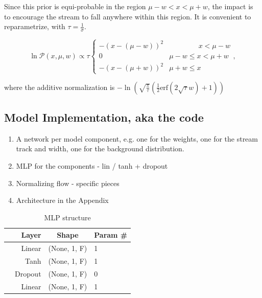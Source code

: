 \documentclass[twocolumn]{aastex631}
\newcommand{\mcal}[1]{\mathcal{#1}}
\newcommand{\pdf}{\mcal{P}}
\begin{document}
            Since this prior is equi-probable in the region $\mu - w < x < \mu + w$, the  impact is to encourage the stream to fall anywhere within this region. 
            It is convenient to reparametrize, with $\tau = \frac{1}{\sigma}$.
            \begin{small}
            \begin{equation}
                \ln \pdf(x,\mu,w) \propto \tau \begin{cases} 
                    -\left(x-(\mu-w)\right)^2 & \phantom{\mu - w <}\ x < \mu - w \\
                    0 & \mu - w \leq x < \mu + w \\
                    -\left(x-(\mu+w)\right)^2 & \mu + w \leq x
                \end{cases},
            \end{equation}\end{small}
            where the additive normalization is 
            $-\ln\left(\sqrt{\frac{\pi}{\tau}} \left(\frac{1}{2}\text{erf}\left(2 \sqrt{\tau } w\right)+1\right)\right)$


    \subsection{Model Implementation, aka the code} \label{sub:model_implementation}


        \begin{enumerate}
            \item A network per model component, e.g. one for the weights, one for the stream track and width, one for the background distribution.
            \item MLP for the components - lin / tanh + dropout
            \item Normalizing flow - specific pieces
            \item Architecture in the Appendix
        \end{enumerate}


        \begin{table}
            \centering
            \caption{MLP structure}
            \begin{tabular}{@{}rrcl@{}}
            \toprule
            & Layer & Shape & Param \# \\
            \midrule
            & Linear & (None, 1, F) & 1  \\
            & Tanh & (None, 1, F) & 1  \\
            & Dropout & (None, 1, F) & 0  \\
            & Linear & (None, 1, F) & 1  \\
            \bottomrule
            \end{tabular}
        \end{table}
\end{document}
